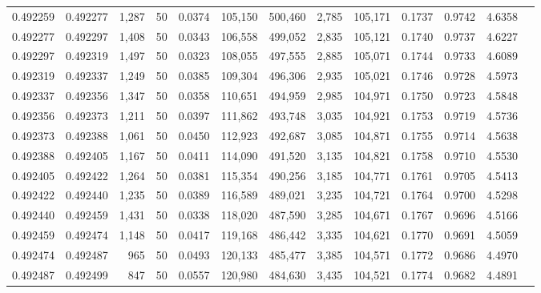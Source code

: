 \begin{tabular}{rrrrrrrrrrrrr}
0.492259 & 0.492277 & 1,287 &  50 &                                     0.0374 & 105,150 & 500,460 &   2,785 & 105,171 & 0.1737 & 0.9742 & 4.6358 \\
0.492277 & 0.492297 & 1,408 &  50 &                                     0.0343 & 106,558 & 499,052 &   2,835 & 105,121 & 0.1740 & 0.9737 & 4.6227 \\
0.492297 & 0.492319 & 1,497 &  50 &                                     0.0323 & 108,055 & 497,555 &   2,885 & 105,071 & 0.1744 & 0.9733 & 4.6089 \\
0.492319 & 0.492337 & 1,249 &  50 &                                     0.0385 & 109,304 & 496,306 &   2,935 & 105,021 & 0.1746 & 0.9728 & 4.5973 \\
0.492337 & 0.492356 & 1,347 &  50 &                                     0.0358 & 110,651 & 494,959 &   2,985 & 104,971 & 0.1750 & 0.9723 & 4.5848 \\
0.492356 & 0.492373 & 1,211 &  50 &                                     0.0397 & 111,862 & 493,748 &   3,035 & 104,921 & 0.1753 & 0.9719 & 4.5736 \\
0.492373 & 0.492388 & 1,061 &  50 &                                     0.0450 & 112,923 & 492,687 &   3,085 & 104,871 & 0.1755 & 0.9714 & 4.5638 \\
0.492388 & 0.492405 & 1,167 &  50 &                                     0.0411 & 114,090 & 491,520 &   3,135 & 104,821 & 0.1758 & 0.9710 & 4.5530 \\
0.492405 & 0.492422 & 1,264 &  50 &                                     0.0381 & 115,354 & 490,256 &   3,185 & 104,771 & 0.1761 & 0.9705 & 4.5413 \\
0.492422 & 0.492440 & 1,235 &  50 &                                     0.0389 & 116,589 & 489,021 &   3,235 & 104,721 & 0.1764 & 0.9700 & 4.5298 \\
0.492440 & 0.492459 & 1,431 &  50 &                                     0.0338 & 118,020 & 487,590 &   3,285 & 104,671 & 0.1767 & 0.9696 & 4.5166 \\
0.492459 & 0.492474 & 1,148 &  50 &                                     0.0417 & 119,168 & 486,442 &   3,335 & 104,621 & 0.1770 & 0.9691 & 4.5059 \\
0.492474 & 0.492487 &   965 &  50 &                                     0.0493 & 120,133 & 485,477 &   3,385 & 104,571 & 0.1772 & 0.9686 & 4.4970 \\
0.492487 & 0.492499 &   847 &  50 &                                     0.0557 & 120,980 & 484,630 &   3,435 & 104,521 & 0.1774 & 0.9682 & 4.4891 \\

\end{tabular}
